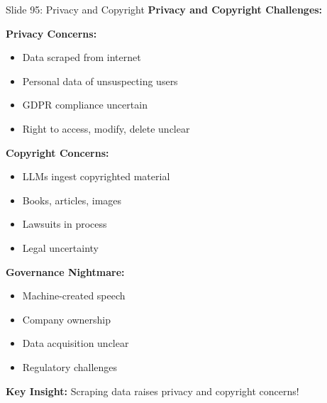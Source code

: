 \documentclass[8pt]{beamer}
\begin{document}
	\begin{frame}{Slide 95: Privacy and Copyright}
		\fontsize{6.5}{7.5}\selectfont
		\textbf{Privacy and Copyright Challenges:}
		
		\vspace{0.1cm}
		\textbf{Privacy Concerns:}
		\begin{itemize}
			\item Data scraped from internet
			\item Personal data of unsuspecting users
			\item GDPR compliance uncertain
			\item Right to access, modify, delete unclear
		\end{itemize}
		
		\vspace{0.1cm}
		\textbf{Copyright Concerns:}
		\begin{itemize}
			\item LLMs ingest copyrighted material
			\item Books, articles, images
			\item Lawsuits in process
			\item Legal uncertainty
		\end{itemize}
		
		\vspace{0.1cm}
		\textbf{Governance Nightmare:}
		\begin{itemize}
			\item Machine-created speech
			\item Company ownership
			\item Data acquisition unclear
			\item Regulatory challenges
		\end{itemize}
		
		\textcolor{myblue}{\textbf{Key Insight:}} Scraping data raises \textcolor{myblue}{privacy and copyright concerns}!
	\end{frame}
	
	
\end{document}
